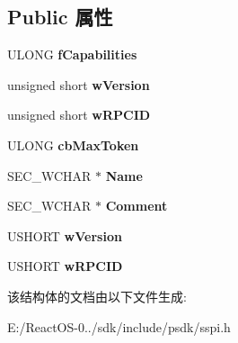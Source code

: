 \subsection*{Public 属性}
\begin{DoxyCompactItemize}
\item 
\mbox{\label{struct___sec_pkg_info_w_ab9168a77159b6ce287a55b151c09dc45}} 
U\+L\+O\+NG {\bfseries f\+Capabilities}
\item 
\mbox{\label{struct___sec_pkg_info_w_a20b2ea8821d8932deb3f9c3d78c8b200}} 
unsigned short {\bfseries w\+Version}
\item 
\mbox{\label{struct___sec_pkg_info_w_a8acbb4b315f02e18953a810650c15c18}} 
unsigned short {\bfseries w\+R\+P\+C\+ID}
\item 
\mbox{\label{struct___sec_pkg_info_w_a09a207b72a4221c98e52f2a9ab2b3dea}} 
U\+L\+O\+NG {\bfseries cb\+Max\+Token}
\item 
\mbox{\label{struct___sec_pkg_info_w_ae4c0d5d22a457e14fc2fd6c328820931}} 
S\+E\+C\+\_\+\+W\+C\+H\+AR $\ast$ {\bfseries Name}
\item 
\mbox{\label{struct___sec_pkg_info_w_a33c8690028c09252b2c39dea32637e3a}} 
S\+E\+C\+\_\+\+W\+C\+H\+AR $\ast$ {\bfseries Comment}
\item 
\mbox{\label{struct___sec_pkg_info_w_afc7feb961a36769861eb40cdbe4efc40}} 
U\+S\+H\+O\+RT {\bfseries w\+Version}
\item 
\mbox{\label{struct___sec_pkg_info_w_aa1a2b77593672bb3fe2442961c211843}} 
U\+S\+H\+O\+RT {\bfseries w\+R\+P\+C\+ID}
\end{DoxyCompactItemize}


该结构体的文档由以下文件生成\+:\begin{DoxyCompactItemize}
\item 
E\+:/\+React\+O\+S-\/0../sdk/include/psdk/sspi.\+h\end{DoxyCompactItemize}
